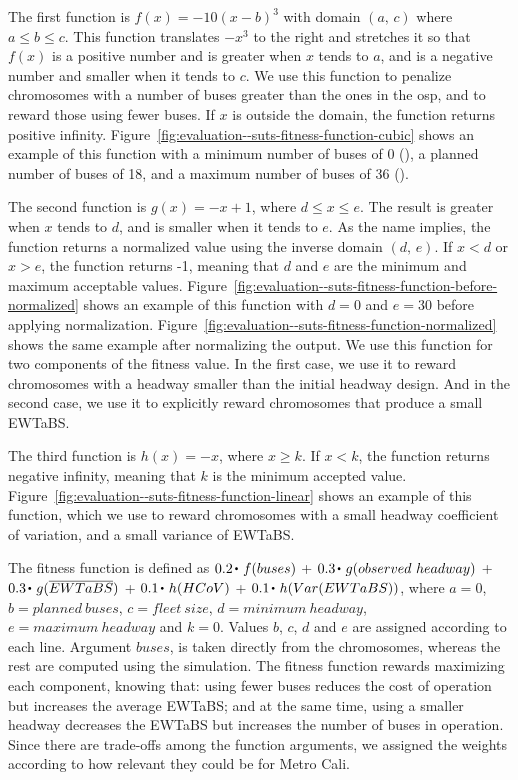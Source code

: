 \begin{description}[style=unboxed,font=\bfseries\normalsize]
	\item[Cubic function] The first function is $f(x)=-10(x-b)^3$ with domain $(a,\,c)$ where $a \leq b \leq c$. This function translates $-x^3$ to the right and stretches it so that $f(x)$ is a positive number and is greater when $x$ tends to $a$, and is a negative number and smaller when it tends to $c$. We use this function to penalize chromosomes with a number of buses greater than the ones in the \gls{osp}, and to reward those using fewer buses. If $x$ is outside the domain, the function returns positive infinity. Figure~\ref{fig:evaluation--suts-fitness-function-cubic} shows an example of this function with a minimum number of buses of 0 (), a planned number of buses of 18, and a maximum number of buses of 36 ().
	\item[Normalized function] The second function is $g(x)=-x+1$, where $d \leq x \leq e$. The result is greater when $x$ tends to $d$, and is smaller when it tends to $e$. As the name implies, the function returns a normalized value using the inverse domain $(d,\,e)$. If $x<d$ or $x>e$, the function returns -1, meaning that $d$ and $e$ are the minimum and maximum acceptable values. Figure~\ref{fig:evaluation--suts-fitness-function-before-normalized} shows an example of this function with $d=0$ and $e=30$ before applying normalization. Figure~\ref{fig:evaluation--suts-fitness-function-normalized} shows the same example after normalizing the output. We use this function for two components of the fitness value. In the first case, we use it to reward chromosomes with a headway smaller than the initial headway design. And in the second case, we use it to explicitly reward chromosomes that produce a small \gls{EWTaBS}.
	\item[Linear function] The third function is $h(x)=-x$, where $x \geq k$. If $x<k$, the function returns negative infinity, meaning that $k$ is the minimum accepted value. Figure~\ref{fig:evaluation--suts-fitness-function-linear} shows an example of this function, which we use to reward chromosomes with a small headway coefficient of variation, and a small variance of \gls{EWTaBS}.
\end{description}

The fitness function is defined as $0.2 \sbt{} f(buses)$ + $0.3 \sbt{} g(observed~headway)$ + $0.3 \sbt{} g(\overline{EWTaBS})$ + $0.1 \sbt{} h(HCoV)$ + $0.1 \sbt h(Var(EWTaBS))$, where $a=0$, $b=planned~buses$, $c=fleet~size$, $d=minimum~headway$, $e=maximum~headway$ and $k=0$. Values $b$, $c$, $d$ and $e$ are assigned according to each line. Argument $buses$, is taken directly from the chromosomes, whereas the rest are computed using the simulation. The fitness function rewards maximizing each component, knowing that: using fewer buses reduces the cost of operation but increases the average \gls{EWTaBS}; and at the same time, using a smaller headway decreases the \gls{EWTaBS} but increases the number of buses in operation. Since there are trade-offs among the function arguments, we assigned the weights according to how relevant they could be for Metro Cali.

